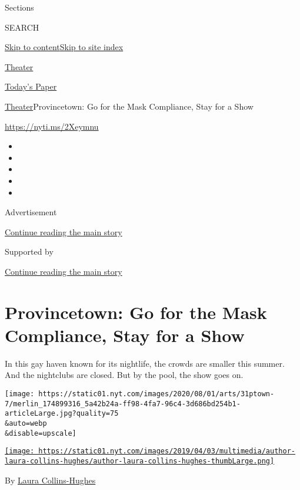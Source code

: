 Sections

SEARCH

\protect\hyperlink{site-content}{Skip to
content}\protect\hyperlink{site-index}{Skip to site index}

\href{https://www.nytimes.com/section/theater}{Theater}

\href{https://myaccount.nytimes.com/auth/login?response_type=cookie\&client_id=vi}{}

\href{https://www.nytimes.com/section/todayspaper}{Today's Paper}

\href{/section/theater}{Theater}\textbar{}Provincetown: Go for the Mask
Compliance, Stay for a Show

\url{https://nyti.ms/2Xeymnu}

\begin{itemize}
\item
\item
\item
\item
\item
\end{itemize}

Advertisement

\protect\hyperlink{after-top}{Continue reading the main story}

Supported by

\protect\hyperlink{after-sponsor}{Continue reading the main story}

\hypertarget{provincetown-go-for-the-mask-compliance-stay-for-a-show}{%
\section{Provincetown: Go for the Mask Compliance, Stay for a
Show}\label{provincetown-go-for-the-mask-compliance-stay-for-a-show}}

In this gay haven known for its nightlife, the crowds are smaller this
summer. And the nightclubs are closed. But by the pool, the show goes
on.

\texttt{[image: https://static01.nyt.com/images/2020/08/01/arts/31ptown-7/merlin\_174899316\_5a42b24a-ff98-4fa7-96c4-3d686bd254b1-articleLarge.jpg?quality=75\\\&auto=webp\\\&disable=upscale]}

\href{https://www.nytimes.com/by/laura-collins-hughes}{\texttt{[image: https://static01.nyt.com/images/2019/04/03/multimedia/author-laura-collins-hughes/author-laura-collins-hughes-thumbLarge.png]}}

By \href{https://www.nytimes.com/by/laura-collins-hughes}{Laura
Collins-Hughes}

